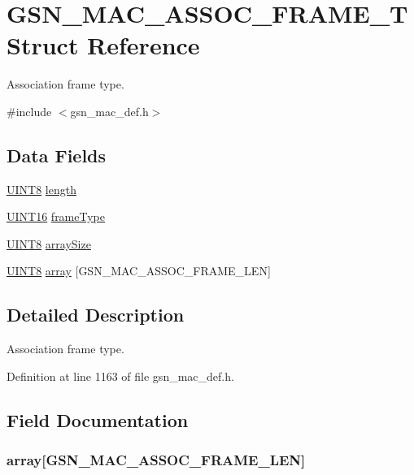 \hypertarget{a00109}{
\section{GSN\_\-MAC\_\-ASSOC\_\-FRAME\_\-T Struct Reference}
\label{a00109}
}


Association frame type.  




{\ttfamily \#include $<$gsn\_\-mac\_\-def.h$>$}

\subsection*{Data Fields}
\begin{DoxyCompactItemize}
\item 
\hyperlink{a00660_gab27e9918b538ce9d8ca692479b375b6a}{UINT8} \hyperlink{a00109_ae360fb41f422c7c83b87d9af070cbd31}{length}
\item 
\hyperlink{a00660_ga09f1a1fb2293e33483cc8d44aefb1eb1}{UINT16} \hyperlink{a00109_a8d99a6146a73b946a6879b071c326978}{frameType}
\item 
\hyperlink{a00660_gab27e9918b538ce9d8ca692479b375b6a}{UINT8} \hyperlink{a00109_a1e9a3e946dd0de39c656edc309a5c36c}{arraySize}
\item 
\hyperlink{a00660_gab27e9918b538ce9d8ca692479b375b6a}{UINT8} \hyperlink{a00109_a89ecc03d7ac55d32b6a54aa23717e6ee}{array} \mbox{[}GSN\_\-MAC\_\-ASSOC\_\-FRAME\_\-LEN\mbox{]}
\end{DoxyCompactItemize}


\subsection{Detailed Description}
Association frame type. 

Definition at line 1163 of file gsn\_\-mac\_\-def.h.



\subsection{Field Documentation}
\hypertarget{a00109_a89ecc03d7ac55d32b6a54aa23717e6ee}{
\subsubsection[{array}]{ {\bf array}\mbox{[}GSN\_\-MAC\_\-ASSOC\_\-FRAME\_\-LEN\mbox{]}}}
\label{a00109_a89ecc03d7ac55d32b6a54aa23717e6ee}


